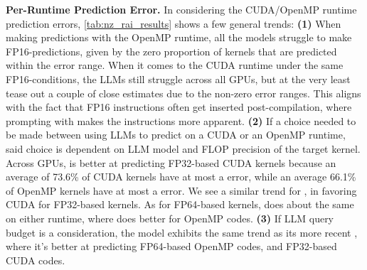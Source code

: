 







\textbf{Per-Runtime Prediction Error.}
In considering the CUDA/OpenMP runtime prediction errors, \autoref{tab:nz_rai_results} shows a few general trends:
\textbf{(1)} When making \sourceonly predictions with the OpenMP runtime, all the models struggle to make FP16-\rai predictions, given by the zero proportion of kernels that are predicted within the \pmfifty error range.
When it comes to the CUDA runtime under the same \sourceonly FP16-\rai conditions, the LLMs still struggle across all GPUs, but at the very least tease out a couple of close \rai estimates due to the non-zero \pmfifty error ranges.
This aligns with the fact that FP16 instructions often get inserted post-compilation, where prompting with \sourceSASS makes the instructions more apparent.
\textbf{(2)} If a choice needed to be made between using LLMs to predict on a CUDA or an OpenMP runtime, said choice is dependent on LLM model and FLOP precision of the target kernel.
Across GPUs, \opus is better at predicting FP32-based CUDA kernels because an average of 73.6\% of CUDA kernels have at most a \pmfifty error, while an average 66.1\% of OpenMP kernels have at most a \pmfifty error.
We see a similar trend for \gptfivefour, in favoring CUDA for FP32-based kernels.
As for FP64-based kernels, \opus does about the same on either runtime, where \gptfivefour does better for OpenMP codes.
\textbf{(3)} If LLM query budget is a consideration, the \gptoss model exhibits the same trend as its more recent \gptfivefour, where it's better at predicting FP64-based OpenMP codes, and FP32-based CUDA codes.

